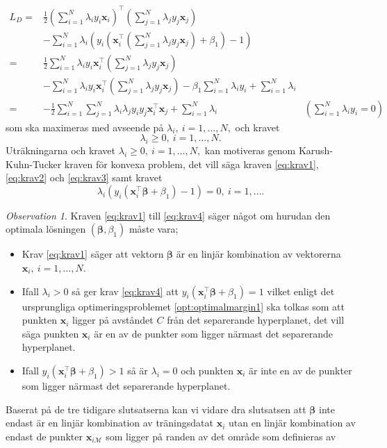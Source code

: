\documentclass[a4paper, 12pt]{report}
\theoremstyle{definition}
\theoremstyle{remark}
\newtheorem*{rem}{Observation}
\newcommand{\bfbeta}{{\boldsymbol{\beta}}}
\begin{document}
\begin{equation*}
\begin{aligned}
	L_D=&\frac{1}{2}\left(\sum_{i=1}^{N}\lambda_i y_i \mathbf{x}_i\right)^\intercal \left(\sum_{j=1}^{N}\lambda_j y_j \mathbf{x}_j\right)&\\
	&- \sum_{i=1}^{N}\lambda_i \left(y_i\left(\mathbf{x}_i^\intercal \left(\sum_{j=1}^{N} \lambda_j y_j \mathbf{x}_j\right) +\beta_1 \right) -1\right)&\\
	=& \frac{1}{2} \sum_{i=1}^{N} \lambda_i y_i \mathbf{x}_i^\intercal\left(\sum_{j=1}^{N} \lambda_j y_j \mathbf{x}_j\right) &\\
	&- \sum_{i=1}^{N}\lambda_i y_i \mathbf{x}_i^\intercal \left(\sum_{j=1}^{N} \lambda_j y_j \mathbf{x}_j\right) - \beta_1 \sum_{i=1}^{N} \lambda_i y_i  + \sum_{i=1}^{N} \lambda_i&\\
	=& -\frac{1}{2} \sum_{i=1}^{N} \sum_{j=1}^{N} \lambda_i \lambda_j y_i y_j \mathbf{x}_i^\intercal \mathbf{x}_j + \sum_{i=1}^{N} \lambda_i &\textstyle{\left(\sum\limits_{i=1}^{N}\lambda_iy_i = 0\right)}
\end{aligned}
\end{equation*}
som ska maximeras med avseende på $\lambda_i,~i=1,\dots,N,$ och kravet \begin{equation}\label{eq:krav3}
	\lambda_i\geq 0,~i=1,\dots,N.
\end{equation} Uträkningarna och kravet $\lambda_i\geq 0,~i=1,\dots,N,$ kan motiveras genom Karush-Kuhn-Tucker kraven för konvexa problem, det vill säga kraven \ref{eq:krav1}, \ref{eq:krav2} och \ref{eq:krav3} samt kravet
\begin{equation}\label{eq:krav4}
	\lambda_i\left( y_i\left( \mathbf{x}_i^\intercal \bfbeta + \beta_1 \right) -1 \right) = 0,~i=1,\dots.
\end{equation}
\begin{rem}
	Kraven \ref{eq:krav1} till \ref{eq:krav4} säger något om hurudan den optimala lösningen $\left(\bfbeta,\beta_1\right)$ måste vara;
	\begin{itemize}
		\item Krav \ref{eq:krav1} säger att vektorn $\bfbeta$ är en linjär kombination av vektorerna $\mathbf{x}_i,~i=1,\dots,N$.
		\item Ifall $\lambda_i > 0$ så ger krav \ref{eq:krav4} att $y_i\left(\mathbf{x}_i^\intercal\bfbeta+\beta_1\right) = 1$ vilket enligt det ursprungliga optimeringsproblemet \ref{opt:optimalmargin1} ska tolkas som att punkten $\mathbf{x}_i$ ligger på avståndet $C$ från det separerande hyperplanet, det vill säga punkten $\mathbf{x}_i$ är en av de punkter som ligger närmast det separerande hyperplanet.
		\item Ifall $y_i\left(\mathbf{x}^\intercal_i\bfbeta + \beta_1\right) > 1$ så är $\lambda_i = 0$ och punkten $\mathbf{x}_i$ är inte en av de punkter som ligger närmast det separerande hyperplanet.
	\end{itemize}
	Baserat på de tre tidigare slutsatserna kan vi vidare dra slutsatsen att $\bfbeta$ inte endast är en linjär kombination av träningsdatat $\mathbf{x}_i$ utan en linjär kombination av endast de punkter $\mathbf{x}_{i\mathcal{M}}$ som ligger på randen av det område som definieras av 
\end{rem}
\end{document}

